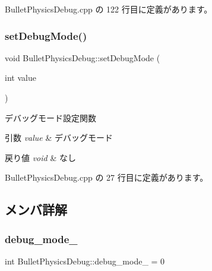  Bullet\+Physics\+Debug.\+cpp の 122 行目に定義があります。

\mbox{\label{class_bullet_physics_debug_ae97707d5b14ac1c55edec5d4686dd802}} 
\subsubsection{\texorpdfstring{set\+Debug\+Mode()}{setDebugMode()}}
{\footnotesize\ttfamily void Bullet\+Physics\+Debug\+::set\+Debug\+Mode (\begin{DoxyParamCaption}\item[{int}]{value }\end{DoxyParamCaption})\hspace{0.3cm}{\ttfamily [override]}}



デバッグモード設定関数 


\begin{DoxyParams}{引数}
{\em value} & デバッグモード \\
\hline
\end{DoxyParams}

\begin{DoxyRetVals}{戻り値}
{\em void} & なし \\
\hline
\end{DoxyRetVals}


 Bullet\+Physics\+Debug.\+cpp の 27 行目に定義があります。



\subsection{メンバ詳解}
\mbox{\label{class_bullet_physics_debug_a7aec768464aa74fc9c97e10bff2375fe}} 
\subsubsection{\texorpdfstring{debug\+\_\+mode\+\_\+}{debug\_mode\_}}
{\footnotesize\ttfamily int Bullet\+Physics\+Debug\+::debug\+\_\+mode\+\_\+ = 0\hspace{0.3cm}{\ttfamily [private]}}




